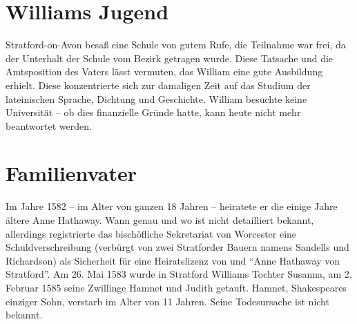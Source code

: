\section{Williams Jugend}

Stratford-on-Avon besaß eine Schule von gutem Rufe, die Teilnahme war frei, da
der Unterhalt der Schule vom Bezirk getragen wurde. Diese Tatsache und die
Amtsposition des Vaters lässt vermuten, das William eine gute Ausbildung
erhielt. Diese konzentrierte sich zur damaligen Zeit auf das Studium der
lateinischen Sprache, Dichtung und Geschichte. William besuchte keine
Universität -- ob dies finanzielle Gründe hatte, kann heute nicht mehr
beantwortet werden.

\section{Familienvater}

Im Jahre 1582 -- im Alter von ganzen 18 Jahren -- heiratete er die einige Jahre
ältere Anne Hathaway. Wann genau und wo ist nicht detailliert bekannt,
allerdings registrierte das bischöfliche Sekretariat von Worcester eine
Schuldverschreibung (verbürgt von zwei Stratforder Bauern namens Sandells und
Richardson) als Sicherheit für eine Heiratslizenz von \WS und
"`Anne Hathaway von Stratford"'. Am 26. Mai 1583 wurde in Stratford Williams
Tochter Susanna, am 2. Februar 1585 seine Zwillinge Hamnet und Judith getauft.
Hamnet, Shakespeares einziger Sohn, verstarb im Alter von 11 Jahren. Seine
Todesursache ist nicht bekannt.
